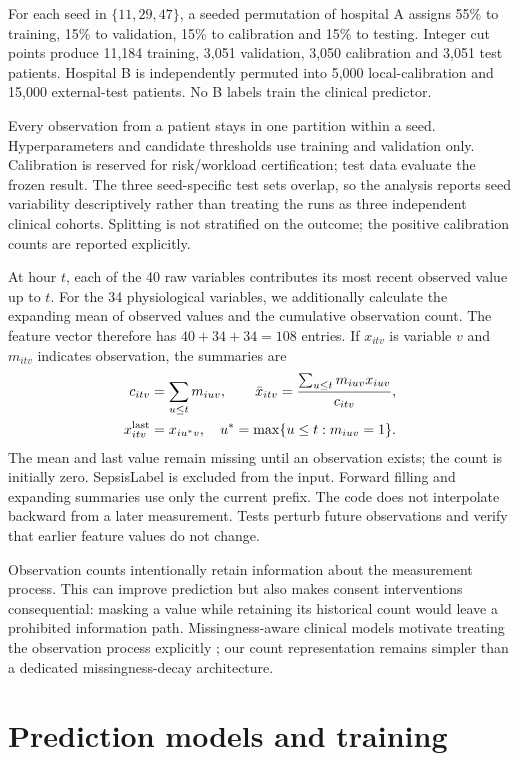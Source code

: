 For each seed in $\{11,29,47\}$, a seeded permutation of hospital A assigns 55\% to training, 15\% to validation, 15\% to calibration and 15\% to testing. Integer cut points produce 11,184 training, 3,051 validation, 3,050 calibration and 3,051 test patients. Hospital B is independently permuted into 5,000 local-calibration and 15,000 external-test patients. No B labels train the clinical predictor.

Every observation from a patient stays in one partition within a seed. Hyperparameters and candidate thresholds use training and validation only. Calibration is reserved for risk/workload certification; test data evaluate the frozen result. The three seed-specific test sets overlap, so the analysis reports seed variability descriptively rather than treating the runs as three independent clinical cohorts. Splitting is not stratified on the outcome; the positive calibration counts are reported explicitly.

At hour $t$, each of the 40 raw variables contributes its most recent observed value up to $t$. For the 34 physiological variables, we additionally calculate the expanding mean of observed values and the cumulative observation count. The feature vector therefore has $40+34+34=108$ entries. If $x_{itv}$ is variable $v$ and $m_{itv}$ indicates observation, the summaries are
\begin{align*}
 c_{itv}&=\sum_{u\le t}m_{iuv},\qquad
 \bar x_{itv}=\frac{\sum_{u\le t}m_{iuv}x_{iuv}}{c_{itv}},\\
 x^{\rm last}_{itv}&=x_{iu^*v},\quad
 u^*=\max\{u\le t:m_{iuv}=1\}.
\end{align*}
The mean and last value remain missing until an observation exists; the count is initially zero. SepsisLabel is excluded from the input. Forward filling and expanding summaries use only the current prefix. The code does not interpolate backward from a later measurement. Tests perturb future observations and verify that earlier feature values do not change.

Observation counts intentionally retain information about the measurement process. This can improve prediction but also makes consent interventions consequential: masking a value while retaining its historical count would leave a prohibited information path. Missingness-aware clinical models motivate treating the observation process explicitly \citep{che2018}; our count representation remains simpler than a dedicated missingness-decay architecture.

\section*{Prediction models and training}

